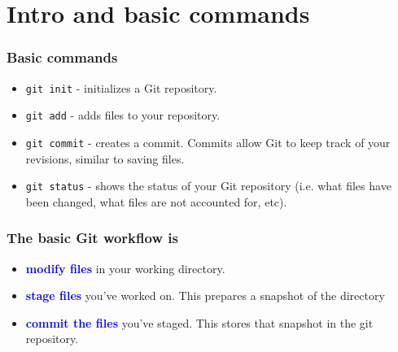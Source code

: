 %
%
\section{Intro and basic commands}

%
%
\begin{frame}[fragile]
  \frametitle{
    Basic commands
  }

  \begin{itemize}%
  \item
    {\tt git init} - initializes a Git repository.
  \item
    {\tt git add} - adds files to your repository.
  \item
    {\tt git commit} - creates a commit. Commits allow Git to keep track of your revisions, similar to saving files.
  \item
    {\tt git status} - shows the status of your Git repository (i.e. what files have been changed, what files are not accounted for, etc).
  \end{itemize}

\end{frame}

%
%
\begin{frame}
  \frametitle{
    The basic Git workflow is
  }

  \begin{itemize}%
  \item
    \textcolor{blue}{\bf modify files} in your working directory.
  \item
    \textcolor{blue}{\bf stage files} you've worked on. This prepares a snapshot of the directory
  \item
    \textcolor{blue}{\bf commit the files} you've staged. This stores that snapshot in the git repository.
  \end{itemize}

\end{frame}

